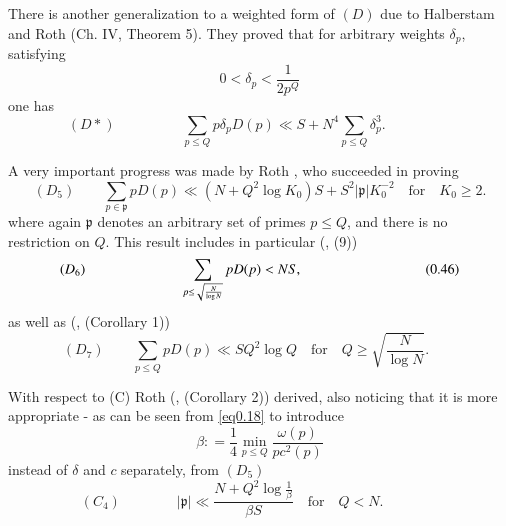 There is another generalization to a weighted form  of $(D)$ due to
Halberstam and Roth \cite{key1} (Ch. IV, Theorem 5). They proved that for
arbitrary weights $\delta _p$, satisfying  
\begin{equation*}
0 < \delta_p < \frac{1}{2  p^Q}\tag{0.43}\label{eq0.43} 
\end{equation*}
one has
\begin{equation*}
(D*) \hspace{2cm} \sum_{p \leq Q} p \delta_p D(p) \ll S+N^4 \sum_{p \leq
    Q}\delta_p^3 . \hspace{2cm}\tag{0.44} \label{eq0.44} 
\end{equation*}

A very important progress was made by Roth \cite{key2},  who succeeded in
proving  
\begin{equation*}
(D_5)\qquad \sum_{p \in \mathfrak{p}} p D(p) \ll (N+Q^2 \log K_0 ) S
  +S^2 |\mathfrak{p}| K_0^{-2} \quad  \text{for}\quad K_0 \ge
  2.\tag{0.45}\label{eq0.45}  
\end{equation*}
where again $\mathfrak{p}$ denotes an arbitrary set of primes $p \leq
Q$, and there is no restriction on $Q$. This result includes in
particular (\cite{key2}, (9)) 
\begin{equation*}
(D_6) \hspace{2.4cm} \sum _{p \leq \sqrt{\frac{N}{\log N}}} p D(p) <
  NS, \hspace{2.4cm} \tag{0.46}\label{eq0.46}  
\end{equation*}\pageoriginale
as well as  (\cite{key2}, (Corollary 1))
\begin{equation*}
(D_7) \qquad   \sum _{p \leq Q}p D(p) \ll  SQ^2 \log Q \quad
  \text{for}\quad Q \ge \sqrt{\frac{N}{\log
      N}}. \qquad  \tag{0.47}\label{eq0.47}  
\end{equation*}

With respect to (C) Roth (\cite{key2}, (Corollary 2)) derived, also
noticing that it is more appropriate - as can be seen from
\eqref{eq0.18} to introduce  
\begin{equation*}
\beta : = \frac {1}{4} \underset{p \leq Q} \min \frac{\omega (p)}{p
  c^2 (p)}\tag{0.48}\label{eq0.48}  
\end{equation*}
instead of $\delta$ and $c$ separately, from $(D_5)$ 
\begin{equation*}
(C_4)\qquad\qquad  |\mathfrak{p}| \ll \frac{N+Q^2 \log \frac{1}{\beta}}{\beta
    S} \quad \text{for}\quad Q < N. \qquad\qquad  \tag{0.49}\label{eq0.49}  
\end{equation*}

